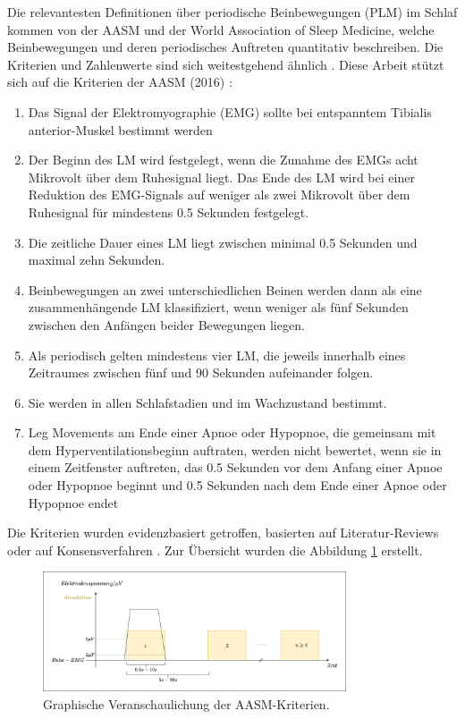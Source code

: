 Die relevantesten Definitionen über periodische Beinbewegungen (PLM) im Schlaf kommen von der \gls{AASM} und der World Association of Sleep Medicine, welche Beinbewegungen und deren periodisches Auftreten quantitativ beschreiben. Die Kriterien und Zahlenwerte sind sich weitestgehend ähnlich \cite{worldsleepcongress}. Diese Arbeit stützt sich auf die Kriterien der AASM (2016) \cite{AASM}:
\begin{enumerate}
	\item Das Signal der Elektromyographie (EMG) sollte bei entspanntem Tibialis anterior-Muskel bestimmt werden 
    \item Der Beginn des LM wird festgelegt, wenn die Zunahme des EMGs acht Mikrovolt über dem Ruhesignal liegt. Das Ende des LM wird bei einer Reduktion des EMG-Signals auf weniger als zwei Mikrovolt über dem Ruhesignal für mindestens 0.5 Sekunden festgelegt.
    \item Die zeitliche Dauer eines LM liegt zwischen minimal 0.5 Sekunden und maximal zehn Sekunden.
    \item Beinbewegungen an zwei unterschiedlichen Beinen werden dann als eine zusammenhängende LM klassifiziert, wenn weniger als fünf Sekunden zwischen den Anfängen beider Bewegungen liegen. 
    \item Als periodisch gelten mindestens vier LM, die jeweils innerhalb eines Zeitraumes zwischen fünf und 90 Sekunden aufeinander folgen.
    \item Sie werden in allen Schlafstadien und im Wachzustand bestimmt.
    \item Leg Movements am Ende einer Apnoe oder Hypopnoe, die gemeinsam mit dem Hyperventilationsbeginn auftraten, werden nicht bewertet, wenn sie in einem Zeitfenster auftreten, das 0.5 Sekunden vor dem Anfang einer Apnoe oder Hypopnoe beginnt und 0.5 Sekunden nach dem Ende einer Apnoe oder Hypopnoe endet
\end{enumerate}
Die Kriterien wurden evidenzbasiert getroffen, basierten auf Literatur-Reviews oder auf Konsensverfahren \cite{PDS}. Zur Übersicht wurden die Abbildung \ref{fig:AASMKrit} erstellt.
\begin{figure}[!ht]%
	\begin{center}
	\includegraphics[width=0.80\textwidth]{./Bilder/AASMLM.drawio (2).png}
	\end{center}
	\caption{Graphische Veranschaulichung der AASM-Kriterien.}%
	\label{fig:AASMKrit}%
\end{figure}
